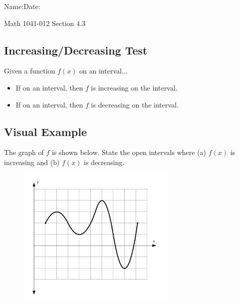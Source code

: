 \documentclass[10pt]{book}
\theoremstyle{definition}
\begin{document}
\begin{flushleft}
Name:\underline{\hspace{13cm}}Date:\underline{\hspace{2cm}}
\end{flushleft}
\begin{center}
{\Large Math 1041-012 \hspace{0.5cm} Section 4.3}
\end{center}

\begin{tcolorbox}
\subsection*{Increasing/Decreasing Test}
Given a function $f(x)$ on an interval...
\begin{itemize}
    \item If \underline{\hspace{3cm}} on an interval, then $f$ is increasing on the interval.
    \item If \underline{\hspace{3cm}} on an interval, then $f$ is decreasing on the interval.
\end{itemize}
\end{tcolorbox}
\subsection*{Visual Example} The graph of $f$ is shown below. State the open intervals where (a) $f(x)$ is increasing and (b) $f(x)$ is decreasing.
\begin{figure}[h!]
    \includegraphics[width=3in]{Rolles1.png}
\end{figure}
\end{document}
